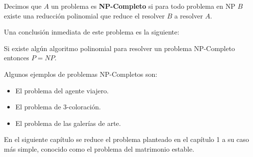 \begin{dfn}
Decimos que $A$ un problema es \textbf{NP-Completo} si para todo problema en NP $B$ existe una reducción polinomial que reduce el resolver $B$ a resolver $A$.
\end{dfn}

Una conclusión inmediata de este problema es la siguiente: 

\begin{obs}
Si existe algún algoritmo polinomial para resolver un problema NP-Completo entonces $P=NP$.
\end{obs}

Algunos ejemplos de problemas NP-Completos son: 

\begin{eje}
\begin{itemize}
\item El problema del agente viajero. 
\item El problema de 3-coloración. 
\item El problema de las galerías de arte.
\end{itemize}
\fin
\end{eje}


En el siguiente capítulo se reduce el problema planteado en el capítulo 1 a su caso más simple, conocido como el problema del matrimonio estable.
